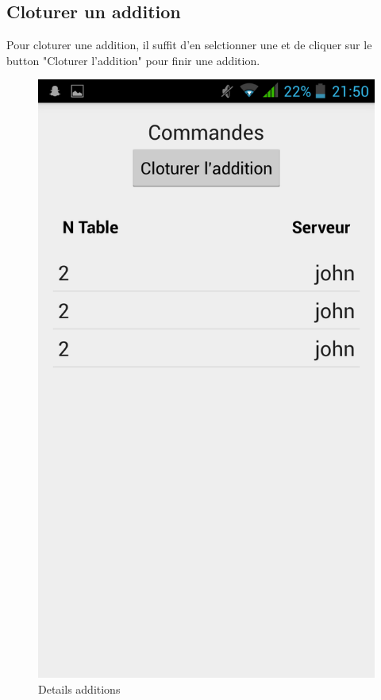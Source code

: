 \subsection{Cloturer un addition}
Pour cloturer une addition, il suffit d'en selctionner une et de cliquer sur le button "Cloturer l'addition" pour finir une addition.

\begin{figure}[H]
	\centering
	\includegraphics[scale=0.15]{img/details-bill.png}
	\caption{Details additions}
	\label{fig:bill-details}
\end{figure}

